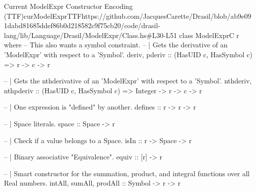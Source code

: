 \begin{haskell}{Current ModelExpr Constructor Encoding (TTF)}{curModelExprTTF}{https://github.com/JacquesCarette/Drasil/blob/ab9e091dabd81685ddef86b0d218582c9f75cb20/code/drasil-lang/lib/Language/Drasil/ModelExpr/Class.hs\#L30-L51}
class ModelExprC r where
  -- This also wants a symbol constraint.
  -- | Gets the derivative of an 'ModelExpr' with respect to a 'Symbol'.
  deriv, pderiv :: (HasUID c, HasSymbol c) => r -> c -> r
  
  -- | Gets the nthderivative of an 'ModelExpr' with respect to a 'Symbol'.
  nthderiv, nthpderiv :: (HasUID c, HasSymbol c) => Integer -> r -> c -> r
  
  -- | One expression is "defined" by another.
  defines :: r -> r -> r
  
  -- | Space literals.
  space :: Space -> r
  
  -- | Check if a value belongs to a Space.
  isIn :: r -> Space -> r
  
  -- | Binary associative "Equivalence".
  equiv :: [r] -> r
  
  -- | Smart constructor for the summation, product, and integral functions over all Real numbers.
  intAll, sumAll, prodAll :: Symbol -> r -> r
\end{haskell}

